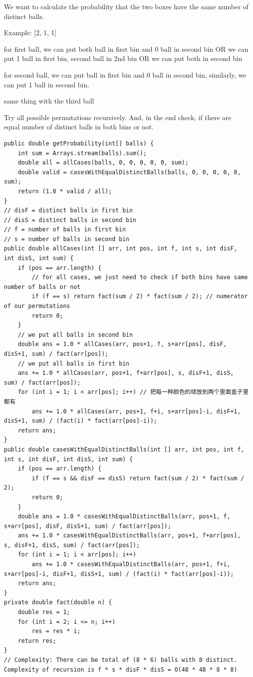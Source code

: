 \documentclass[9pt, b5paaper]{book}
\begin{document}
We want to calculate the probability that the two boxes have the same number of distinct balls.

Example: [2, 1, 1]

for first ball, we can put both ball in first bin and 0 ball in second bin OR we can put 1 ball in first bin, second ball in 2nd bin OR we can put both in second bin

for second ball, we can put ball in first bin and 0 ball in second bin, similarly, we can put 1 ball in second bin.

same thing with the third ball

Try all possible permutations recursively. And, in the end check, if there are equal number of distinct balls in both bins or not.

\begin{verbatim}
public double getProbability(int[] balls) {
    int sum = Arrays.stream(balls).sum();
    double all = allCases(balls, 0, 0, 0, 0, 0, sum);
    double valid = casesWithEqualDistinctBalls(balls, 0, 0, 0, 0, 0, sum);
    return (1.0 * valid / all);
}
// disF = distinct balls in first bin
// disS = distinct balls in second bin
// f = number of balls in first bin
// s = number of balls in second bin
public double allCases(int [] arr, int pos, int f, int s, int disF, int disS, int sum) {
    if (pos == arr.length) {
        // for all cases, we just need to check if both bins have same number of balls or not
        if (f == s) return fact(sum / 2) * fact(sum / 2); // numerator of our permutations
        return 0;
    }
    // we put all balls in second bin
    double ans = 1.0 * allCases(arr, pos+1, f, s+arr[pos], disF, disS+1, sum) / fact(arr[pos]);
    // we put all balls in first bin
    ans += 1.0 * allCases(arr, pos+1, f+arr[pos], s, disF+1, disS, sum) / fact(arr[pos]);
    for (int i = 1; i < arr[pos]; i++) // 把每一种颜色的球放到两个里面盒子里都有
        ans += 1.0 * allCases(arr, pos+1, f+i, s+arr[pos]-i, disF+1, disS+1, sum) / (fact(i) * fact(arr[pos]-i));
    return ans;
}
public double casesWithEqualDistinctBalls(int [] arr, int pos, int f, int s, int disF, int disS, int sum) {
    if (pos == arr.length) {
        if (f == s && disF == disS) return fact(sum / 2) * fact(sum / 2);
        return 0;
    }
    double ans = 1.0 * casesWithEqualDistinctBalls(arr, pos+1, f, s+arr[pos], disF, disS+1, sum) / fact(arr[pos]);
    ans += 1.0 * casesWithEqualDistinctBalls(arr, pos+1, f+arr[pos], s, disF+1, disS, sum) / fact(arr[pos]);
    for (int i = 1; i < arr[pos]; i++) 
        ans += 1.0 * casesWithEqualDistinctBalls(arr, pos+1, f+i, s+arr[pos]-i, disF+1, disS+1, sum) / (fact(i) * fact(arr[pos]-i));
    return ans;
}
private double fact(double n) {
    double res = 1;
    for (int i = 2; i <= n; i++) 
        res = res * i;
    return res;
}
// Complexity: There can be total of (8 * 6) balls with 8 distinct. Complexity of recursion is f * s * disF * disS = O(48 * 48 * 8 * 8)
\end{verbatim}
\end{document}
